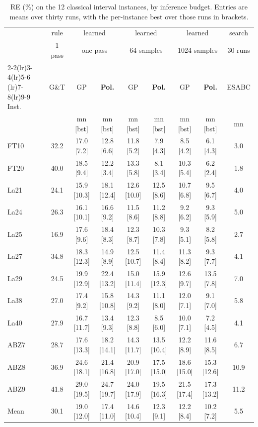 \documentclass[preprint,12pt]{elsarticle}
\theoremstyle{definition}
\theoremstyle{remark}
\begin{document}
\begin{table}[!htb]
\centering\small
\caption{RE (\%) on the 12 classical interval instances, by inference
budget. Entries are means over thirty runs, with the per-instance
best over those runs in brackets.}
\label{tab:classics}
\footnotesize
\setlength{\tabcolsep}{3.5pt}
\begin{tabular}{lcccccccc}
\toprule
& rule & \multicolumn{2}{c}{learned} &
\multicolumn{2}{c}{learned} & \multicolumn{2}{c}{learned} & search \\
& 1 pass & \multicolumn{2}{c}{one pass} &
\multicolumn{2}{c}{64 samples} & \multicolumn{2}{c}{1024 samples} &
30 runs \\
\cmidrule(lr){2-2}\cmidrule(lr){3-4}\cmidrule(lr){5-6}
\cmidrule(lr){7-8}\cmidrule(lr){9-9}
Inst. & G\&T & GP & \textbf{Pol.} & GP & \textbf{Pol.} & GP &
\textbf{Pol.} & ESABC \\
 & & {\scriptsize mn [bst]} & {\scriptsize mn [bst]} &
{\scriptsize mn [bst]} & {\scriptsize mn [bst]} &
{\scriptsize mn [bst]} & {\scriptsize mn [bst]} &
{\scriptsize mn} \\
\midrule
FT10 & 32.2 & 17.0 [7.2] & 12.8 [6.6] & 11.8 [5.2] & 7.9 [4.3] & 8.5 [4.2] & 6.1 [4.3] & 3.0 \\
FT20 & 40.0 & 18.5 [9.4] & 12.2 [3.4] & 13.3 [5.8] & 8.1 [3.4] & 10.3 [5.4] & 6.2 [2.4] & 1.8 \\
La21 & 24.1 & 15.9 [10.3] & 18.1 [12.4] & 12.6 [10.0] & 12.5 [8.6] & 10.7 [6.8] & 9.5 [6.7] & 4.0 \\
La24 & 26.3 & 16.1 [10.1] & 16.6 [9.2] & 11.5 [8.6] & 11.2 [8.8] & 9.2 [6.2] & 9.3 [5.9] & 5.0 \\
La25 & 16.9 & 17.6 [9.6] & 18.4 [8.3] & 12.3 [8.7] & 10.3 [7.8] & 9.3 [5.1] & 8.2 [5.8] & 2.7 \\
La27 & 34.8 & 18.3 [12.3] & 14.9 [8.9] & 12.5 [10.7] & 11.4 [8.4] & 11.3 [8.2] & 9.3 [7.7] & 4.1 \\
La29 & 24.5 & 19.9 [12.9] & 22.4 [13.2] & 15.0 [11.4] & 15.9 [12.3] & 12.6 [9.7] & 13.5 [7.8] & 7.0 \\
La38 & 27.0 & 17.4 [9.2] & 15.8 [10.8] & 14.3 [9.2] & 11.1 [8.0] & 12.0 [7.1] & 9.1 [7.0] & 5.8 \\
La40 & 27.9 & 16.7 [11.7] & 13.4 [9.3] & 12.3 [8.8] & 8.5 [6.0] & 10.0 [7.1] & 7.2 [4.5] & 4.1 \\
ABZ7 & 28.7 & 17.6 [13.3] & 18.2 [14.1] & 14.3 [11.7] & 13.5 [10.4] & 12.2 [8.9] & 11.6 [8.5] & 6.7 \\
ABZ8 & 36.9 & 24.6 [18.1] & 21.4 [16.8] & 20.9 [17.0] & 17.5 [15.0] & 18.6 [15.0] & 15.3 [12.6] & 10.9 \\
ABZ9 & 41.8 & 29.0 [19.5] & 24.7 [19.7] & 24.0 [17.9] & 19.5 [16.3] & 21.5 [17.4] & 17.3 [13.2] & 11.2 \\
\midrule
Mean & 30.1 & 19.0 [12.0] & 17.4 [11.0] & 14.6 [10.4] & 12.3 [9.1] & 12.2 [8.4] & 10.2 [7.2] & 5.5 \\
\bottomrule
\end{tabular}
\end{table}
\end{document}
